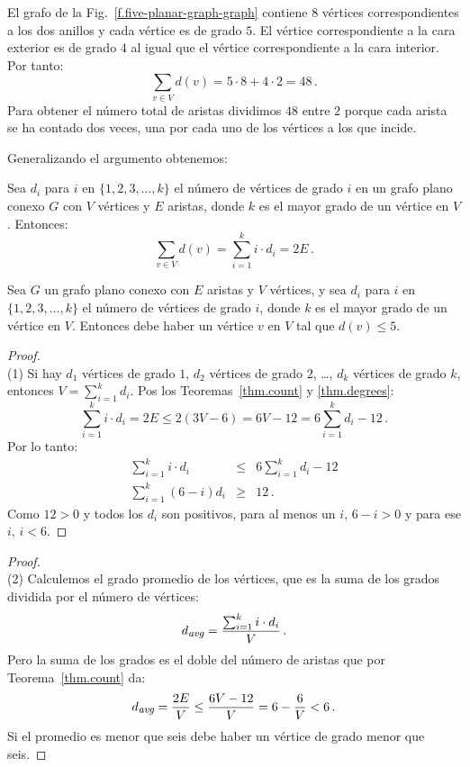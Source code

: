 \begin{example}
El grafo de la Fig.~\ref{f.five-planar-graph-graph} contiene $8$ vértices correspondientes a los dos anillos y cada vértice es de grado $5$. El vértice correspondiente a la cara exterior es de grado $4$ al igual que el vértice correspondiente a la cara interior. Por tanto:
\[
\sum_{v\in V} d(v) = 5\cdot 8 + 4\cdot 2=48\,.
\]
Para obtener el número total de aristas dividimos $48$ entre $2$ porque cada arista se ha contado dos veces, una por cada uno de los vértices a los que incide.
\end{example}

Generalizando el argumento obtenemos:
\begin{theorem}\label{thm.degrees}
Sea $d_i$ para $i$ en $\{1,2,3,\ldots,k\}$ el número de vértices de grado $i$ en un grafo plano conexo $G$ con $V$ vértices y $E$ aristas, donde $k$ es el mayor grado de un vértice en $V$. Entonces:
\[
\sum_{v\in V} d(v) =\sum_{i=1}^{k} i\cdot d_i=2E\,.
\]
\end{theorem}

\begin{theorem}\label{thm.degree5}
Sea $G$ un grafo plano conexo con $E$ aristas y $V$ vértices, y sea $d_i$ para $i$ en $\{1,2,3,\ldots,k\}$ el número de vértices de grado $i$, donde $k$ es el mayor grado de un vértice en $V$. Entonces debe haber un vértice $v$ en $V$ tal que $d(v) \leq 5$.
\end{theorem}

\begin{proof}
\mbox{}\\
(1)
Si hay $d_1$ vértices de grado $1$, $d_2$ vértices de grado $2$, \ldots, $d_k$ vértices de grado $k$, entonces $V=\sum_{i=1}^{k}d_i$.  Pos los Teoremas~\ref{thm.count} y \ref{thm.degrees}:
\[
\sum_{i=1}^{k} i\cdot d_i=2E\leq 2(3V-6) = 6V-12=6\sum_{i=1}^{k} d_i -12\,.
\]
Por lo tanto:
\begin{eqnarray*}
\sum_{i=1}^{k} i\cdot d_i &\leq& 6\sum_{i=1}^{k} d_i -12\\
\sum_{i=1}^{k} (6-i)d_i&\geq& 12\,.
\end{eqnarray*}
Como $12>0$ y todos los $d_i$ son positivos, para al menos un $i$, $6-i>0$ y para ese $i$, $i<6$.
\end{proof}

\begin{proof}
\mbox{}\\
(2)
Calculemos el grado promedio de los vértices, que es la suma de los grados dividida por el número de vértices:
\[
d_{\textit{\footnotesize avg}}=\frac{\sum_{i=1}^{k} i\cdot d_i}{V}\,.
\]
Pero la suma de los grados es el doble del número de aristas que por Teorema~\ref{thm.count} da:
\[
d_{\textit{\footnotesize avg}}=\frac{2E}{V}\leq \frac{6V-12}{V}=6-\frac{6}{V}<6\,.
\]
Si el promedio es menor que seis debe haber un vértice de grado menor que seis.
\end{proof}

